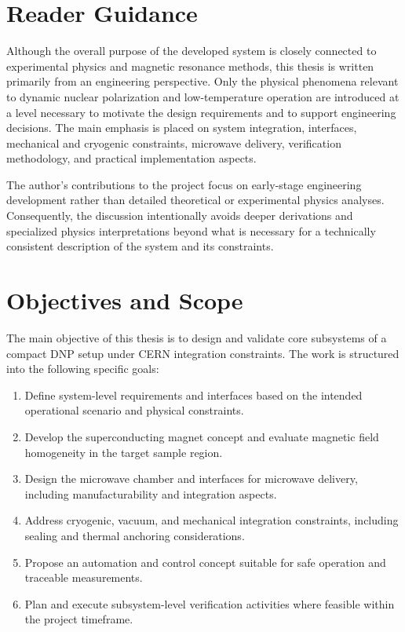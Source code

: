 \documentclass[FM,DP,EN,twoside]{tulthesis}
\begin{document}
\section{Reader Guidance}
\label{sec:engineering-scope-reader-guidance}
Although the overall purpose of the developed system is closely connected to experimental physics and magnetic resonance methods, this thesis is written primarily from an engineering perspective. Only the physical phenomena relevant to dynamic nuclear polarization and low-temperature operation are introduced at a level necessary to motivate the design requirements and to support engineering decisions. The main emphasis is placed on system integration, interfaces, mechanical and cryogenic constraints, microwave delivery, verification methodology, and practical implementation aspects.

The author's contributions to the project focus on early-stage engineering development rather than detailed theoretical or experimental physics analyses. Consequently, the discussion intentionally avoids deeper derivations and specialized physics interpretations beyond what is necessary for a technically consistent description of the system and its constraints.

\section{Objectives and Scope}
\label{sec:objectives-scope}

The main objective of this thesis is to design and validate core subsystems of a compact DNP setup under CERN integration constraints. The work is structured into the following specific goals:
\begin{enumerate}
  \item Define system-level requirements and interfaces based on the intended operational scenario and physical constraints.
  \item Develop the superconducting magnet concept and evaluate magnetic field homogeneity in the target sample region.
  \item Design the microwave chamber and interfaces for microwave delivery, including manufacturability and integration aspects.
  \item Address cryogenic, vacuum, and mechanical integration constraints, including sealing and thermal anchoring considerations.
  \item Propose an automation and control concept suitable for safe operation and traceable measurements.
  \item Plan and execute subsystem-level verification activities where feasible within the project timeframe.
\end{enumerate}
\end{document}
